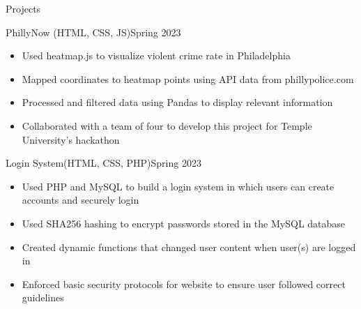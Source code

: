 \documentclass[]{mcdowellcv}
\begin{document}
	\makeheader
	
	\begin{cvsection}{Projects}
		\begin{cvsubsection}{PhillyNow (HTML, CSS, JS)}{}{Spring 2023}
			\begin{itemize}
				\item Used heatmap.js to visualize violent crime rate in Philadelphia
				\item Mapped coordinates to heatmap points using API data from phillypolice.com
				\item Processed and filtered data using Pandas to display relevant information
				\item Collaborated with a team of four to develop this project for Temple University's hackathon
			\end{itemize}
		\end{cvsubsection}

		\begin{cvsubsection}{Login System(HTML, CSS, PHP)}{}{Spring 2023}
			\begin{itemize}
				\item Used PHP and MySQL to build a login system in which users can create accounts and securely login
				\item Used SHA256 hashing to encrypt passwords stored in the MySQL database
				\item Created dynamic functions that changed user content when user(s) are logged in
				\item Enforced basic security protocols for website to ensure user followed correct guidelines
			\end{itemize}
		\end{cvsubsection}

	\end{cvsection}
\end{document}

